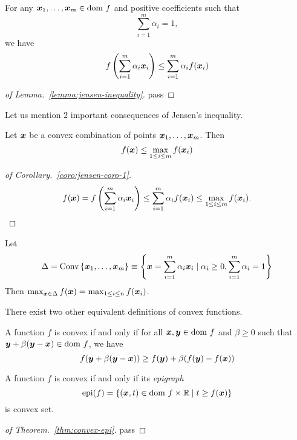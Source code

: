 \begin{lemma}\label{lemma:jensen-inequality}
    For any \(\bm{x}_1, \dots, \bm{x}_m \in \mathrm{dom}~ f\) and positive coefficients such that
    \[
      \sum_{i=1}^{m} \alpha_i = 1,  
    \]
    we have
    \begin{equation}
        f \left( \sum_{i=1}^{m} \alpha_i \bm{x}_i \right) \le \sum_{i=1}^{m} \alpha_i f(\bm{x}_i)
    \end{equation}
\end{lemma}

\begin{proof}[of Lemma.~\ref{lemma:jensen-inequality}]
    pass
\end{proof}

Let us mention \(2\) important consequences of Jensen's inequality.
\begin{coro}\label{coro:jensen-coro-1}
    Let \(\bm{x}\) be a convex combination of points \(\bm{x}_1, \dots, \bm{x}_m\). Then
    \[
        f(\bm{x}) \le \max_{1 \le i \le m} f(\bm{x}_i)  
    \]
\end{coro}
\begin{proof}[of Corollary.~\ref{coro:jensen-coro-1}]
    \[
        f(\bm{x}) = f\left( \sum_{i = 1}^{m} \alpha_i \bm{x}_i \right) 
        \le \sum_{i=1}^m \alpha_i f(\bm{x}_i) \le \max_{1 \le i \le m} f(\bm{x}_i).
    \]
\end{proof}

\begin{coro}\label{coro:jensen-coro-2}
    Let 
    \[
        \Delta = \mathrm{Conv}\left\{\bm{x}_1, \dots ,\bm{x}_m\right\} \equiv 
        \left\{ \bm{x} = \sum_{i=1}^m \alpha_i \bm{x}_i \mid 
        \alpha_i \ge 0, \sum_{i=1}^m \alpha_i = 1 \right\}
    \]
    Then \(\max_{\bm{x} \in \Delta} f(\bm{x}) = \max_{1 \le i \le n} f(\bm{x}_i)\).
\end{coro}

There exist two other equivalent definitions of convex functions.
\begin{thm}\label{thm:convex-defn-1}
    A function \(f\) is convex if and only if for all \(\bm{x}, \bm{y} \in \mathrm{dom}~ f\) and \(\beta \ge 0\) such that
    \(\bm{y} + \beta (\bm{y} - \bm{x}) \in \mathrm{dom}~ f\), we have
    \begin{equation}
        f(\bm{y} + \beta (\bm{y} - \bm{x})) \ge f(\bm{y}) + \beta (f(\bm{y}) - f(\bm{x}))
    \end{equation}
\end{thm}

\begin{thm}\label{thm:convex-epi}
    A function $f$ is convex if and only if its \emph{epigraph}
    \[
        \mathrm{epi}(f) = \left\{ (\bm{x}, t) \in \mathrm{dom}~ f \times \mathbb{R} \mid t \ge f(\bm{x}) \right\}  
    \]
    is convex set.
\end{thm}
\begin{proof}[of Theorem.~\ref{thm:convex-epi}]
    pass
\end{proof}

